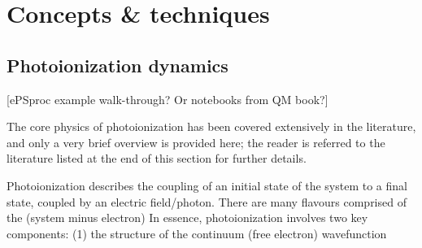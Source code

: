 \section{Concepts \& techniques}

\subsection{Photoionization dynamics} 
[ePSproc example walk-through? Or notebooks from QM book?]

The core physics of photoionization has been covered extensively in the literature, and only a very brief overview is provided here; the reader is referred to the literature listed at the end of this section for further details.

Photoionization describes the coupling of an initial state of the system to a final state, coupled by an electric field/photon. There are many flavours
comprised of the (system minus electron)  In essence, photoionization involves two key components: (1) the structure of the continuum (free electron) wavefunction 